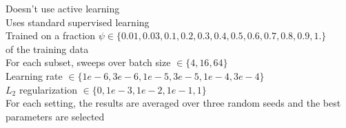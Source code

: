\documentclass[preview]{standalone}
\begin{document}
Doesn't use active learning\\Uses standard supervised learning\\Trained on a fraction $\psi \in \{0.01, 0.03, 0.1, 0.2, 0.3, 0.4, 0.5, 0.6, 0.7, 0.8, 0.9, 1.\}$ \\
                of the training data\\For each subset, sweeps over batch size $\in \{4, 16, 64\}$\\Learning rate $\in \{1e-6, 3e-6, 1e-5, 3e-5, 1e-4, 3e-4\}$\\$L_2$ regularization $\in \{0, 1e-3, 1e-2, 1e-1, 1\}$\\For each setting, the results are averaged over three random seeds and the best parameters are selected\\
\end{document}
